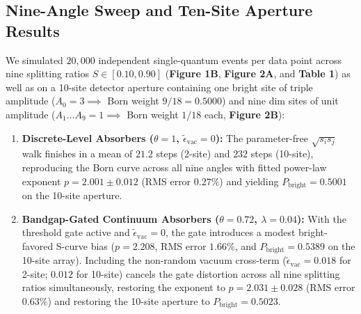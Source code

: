 \documentclass[11pt,a4paper]{article}
\begin{document}
\subsection{Nine-Angle Sweep and Ten-Site Aperture Results}
We simulated $20{,}000$ independent single-quantum events per data point across nine splitting ratios $S \in [0.10, 0.90]$ (\textbf{Figure 1B}, \textbf{Figure 2A}, and \textbf{Table 1}) as well as on a 10-site detector aperture containing one bright site of triple amplitude ($A_0 = 3 \implies$ Born weight $9/18 = 0.5000$) and nine dim sites of unit amplitude ($A_1\dots A_9 = 1 \implies$ Born weight $1/18$ each, \textbf{Figure 2B}):
\begin{enumerate}[leftmargin=*]
    \item \textbf{Discrete-Level Absorbers ($\theta = 1$, $\tilde{\epsilon}_{\mathrm{vac}} = 0$):} The parameter-free $\sqrt{s_i s_j}$ walk finishes in a mean of $21.2$ steps (2-site) and $232$ steps (10-site), reproducing the Born curve across all nine angles with fitted power-law exponent \textbf{$p = 2.001 \pm 0.012$} (RMS error $0.27\%$) and yielding \textbf{$P_{\mathrm{bright}} = 0.5001$} on the 10-site aperture.
    \item \textbf{Bandgap-Gated Continuum Absorbers ($\theta = 0.72$, $\lambda = 0.04$):} With the threshold gate active and $\tilde{\epsilon}_{\mathrm{vac}} = 0$, the gate introduces a modest bright-favored S-curve bias ($p = 2.208$, RMS error $1.66\%$, and $P_{\mathrm{bright}} = 0.5389$ on the 10-site array). Including the non-random vacuum cross-term ($\tilde{\epsilon}_{\mathrm{vac}} = 0.018$ for 2-site; $0.012$ for 10-site) cancels the gate distortion across all nine splitting ratios simultaneously, restoring the exponent to \textbf{$p = 2.031 \pm 0.028$} (RMS error \textbf{$0.63\%$}) and restoring the 10-site aperture to \textbf{$P_{\mathrm{bright}} = 0.5023$}.
\end{enumerate}
\end{document}
